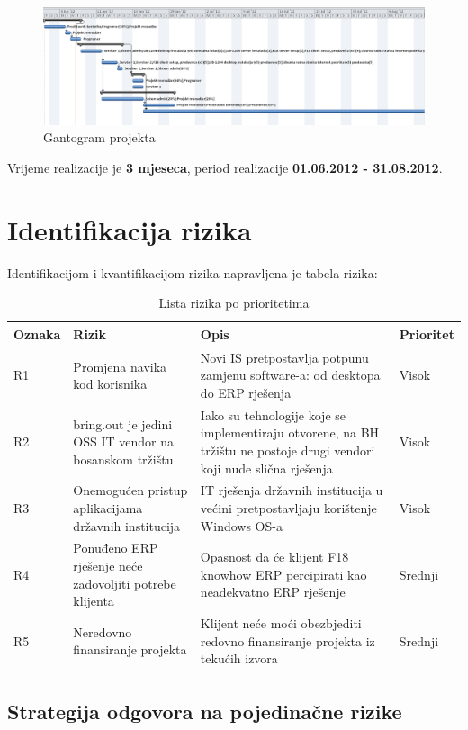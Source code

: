 \documentclass[times, utf8, seminar]{fit}
\begin{document}
\begin{figure}[!h]
\centering
\includegraphics[width=15.5cm]{img/dinamika_gant.png}
\caption{Gantogram projekta}
\end{figure}

Vrijeme realizacije je \textbf{3 mjeseca}, period realizacije \textbf{01.06.2012 - 31.08.2012}.
\section{Identifikacija rizika}
Identifikacijom i kvantifikacijom rizika napravljena je tabela rizika:
\begin{table}[!h]
\centering
\begin{tabular}{ |p{1.5cm}|p{4cm}|p{7.5cm}|p{1.5cm}| }
\hline
Oznaka & Rizik & Opis & Prioritet  \\ \hline\hline
R1 & Promjena navika kod korisnika & Novi IS pretpostavlja potpunu zamjenu software-a: od desktopa do ERP rješenja & Visok \\ \hline
R2 & bring.out je jedini OSS IT vendor na bosanskom tržištu & Iako su tehnologije koje se implementiraju otvorene, na BH tržištu ne postoje drugi vendori koji nude slična rješenja & Visok \\ \hline
R3 & Onemogućen pristup aplikacijama državnih institucija & IT rješenja državnih institucija u većini pretpostavljaju korištenje Windows OS-a & Visok \\ \hline
R4 & Ponuđeno ERP rješenje neće zadovoljiti potrebe klijenta & Opasnost da će klijent F18 knowhow ERP percipirati kao neadekvatno ERP rješenje & Srednji \\ \hline
R5 & Neredovno finansiranje projekta & Klijent neće moći obezbjediti redovno finansiranje projekta iz tekućih izvora & Srednji \\ \hline
\end{tabular}
\caption{Lista rizika po prioritetima}
\end{table}

\subsection{Strategija odgovora na pojedinačne rizike} 
\end{document}
